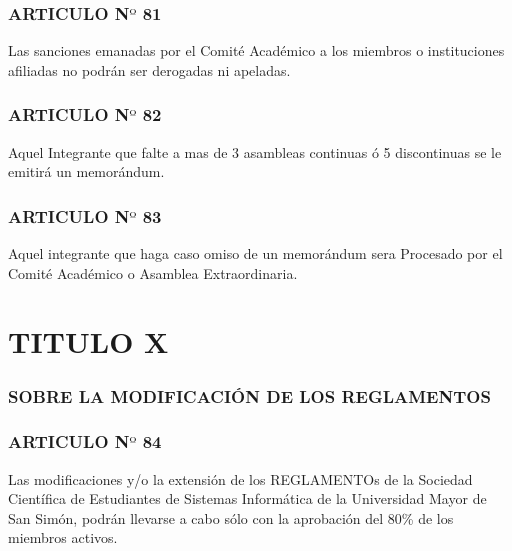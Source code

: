 \documentclass[11pt,letterpaper]{book}
\begin{document}
\subsubsection*{ARTICULO N$º$ 81} 
Las sanciones emanadas por el Comité Académico a los miembros o instituciones afiliadas no podrán ser derogadas ni apeladas.
\subsubsection*{ARTICULO N$º$ 82} 
Aquel Integrante que falte a mas de 3 asambleas continuas ó 5 discontinuas se le emitirá un memorándum.
\subsubsection*{ARTICULO N$º$ 83} 
Aquel integrante que  haga caso omiso de un memorándum sera Procesado por el Comité Académico o Asamblea Extraordinaria.
\section*{TITULO X}
\subsubsection*{SOBRE LA MODIFICACIÓN DE LOS REGLAMENTOS}
\subsubsection*{ARTICULO N$º$ 84} 
Las modificaciones y/o la extensión de los REGLAMENTOs de la Sociedad Científica de Estudiantes de Sistemas Informática de la Universidad Mayor de San Simón, podrán llevarse a cabo sólo con la aprobación del 80\% de los miembros activos. 
\end{document}
